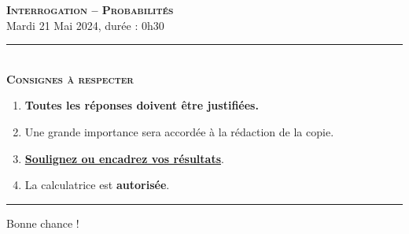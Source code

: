 \documentclass[11pt]{article}
\begin{document}
\begin{center}
\textbf{\LARGE \textsc{Interrogation -- Probabilités}}\\[2mm]

{\large Mardi 21 Mai 2024, durée : 0h30}\\[1mm]
\noindent\rule{8cm}{0.4pt}\\[1mm]
\textbf{\textsc{Consignes à respecter}}
\begin{enumerate}[label=\textbf{\arabic*/}]
\item \textbf{Toutes les réponses doivent être justifiées.}
\item Une grande importance sera accordée à la rédaction de la
  copie.
\item \underline{\textbf{Soulignez ou encadrez vos résultats}}.
\item La calculatrice est \textbf{autorisée}.
    \end{enumerate}
\noindent\rule{12cm}{0.4pt}
\end{center}

\begin{center}
  Bonne chance !
\end{center}

%
%
\end{document}
